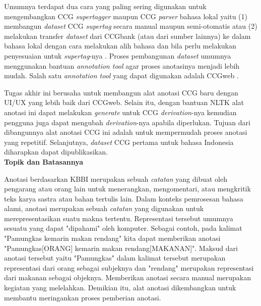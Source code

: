 Umumnya terdapat dua cara yang paling sering digunakan untuk mengembangkan CCG \textit{supertagger}
maupun CCG \textit{parser} bahasa lokal yaitu (1) membangun \textit{dataset} CCG \textit{supertag}
secara manual maupun semi-otomatis atau (2) melakukan transfer \textit{dataset} dari CCGbank
(atau dari sumber lainnya) ke dalam bahasa lokal dengan cara melakukan alih bahasa dan bila perlu
melakukan penyesuaian untuk \textit{supertag}-nya \citep{hockenmaier-steedman-2007-ccgbank}.
Proses pembangunan \textit{dataset} umumnya menggunakan bantuan \textit{annotation tool} agar
proses anotasinya menjadi lebih mudah.
Salah satu \textit{annotation tool} yang dapat digunakan adalah
CCGweb \citep{evang-etal-2019-ccgweb}.

Tugas akhir ini berusaha untuk membangun alat anotasi CCG baru dengan
UI/UX yang lebih baik dari CCGweb.
Selain itu, dengan bantuan NLTK alat anotasi ini dapat melakukan \textit{generate} untuk
CCG \textit{derivation}-nya kemudian pengguna juga dapat mengubah \textit{derivation}-nya
apabila diperlukan.
Tujuan dari dibangunnya alat anotasi CCG ini adalah untuk mempermudah proses anotasi yang
repetitif.
Selanjutnya, \textit{dataset} CCG pertama untuk bahasa Indonesia diharapkan dapat dipublikasikan.
\\


\noindent\textbf{Topik dan Batasannya}


Anotasi berdasarkan KBBI merupakan sebuah \textit{catatan} yang dibuat oleh pengarang atau
orang lain untuk menerangkan, mengomentari, atau mengkritik teks karya sastra atau
bahan tertulis lain. Dalam konteks pemrosesan bahasa alami, anotasi merupakan sebuah
\textit{catatan} yang digunakan untuk merepresentasikan suatu makna tertentu.
Representasi tersebut umumnya sesuatu yang dapat "dipahami" oleh komputer.
Sebagai contoh, pada kalimat "Pamungkas kemarin makan rendang" kita dapat memberikan anotasi
"Pamungkas[ORANG] kemarin makan rendang[MAKANAN]". Maksud dari anotasi tersebut yaitu "Pamungkas"
dalam kalimat tersebut merupakan representasi dari orang sebagai subjeknya dan "rendang"
merupakan representasi dari makanan sebagai objeknya. Memberikan anotasi secara manual merupakan
kegiatan yang melelahkan. Demikian itu, alat anotasi dikembangkan untuk membantu meringankan
proses pemberian anotasi.

